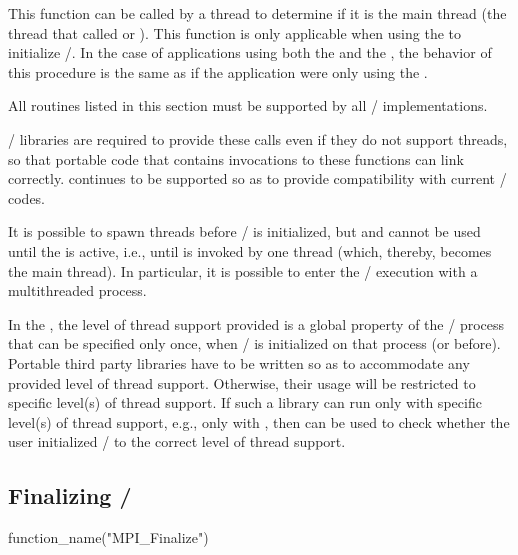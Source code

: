 This function can be called by a thread to determine if it is the
main thread (the thread that called  or
).  This function is only applicable when using the \wpm{} to
initialize \MPI/.  In the case of applications using both the \wpm{}
and the \spm{}, the behavior of this procedure is the same as if the application were only using the \wpm{}.

All routines listed in this section
must be
supported by all \MPI/ implementations.

\begin{rationale}
\MPI/ libraries are required to provide these calls even if they do
not support threads, so that portable code that contains invocations
to these functions can link correctly.  
continues to be
supported so as to provide compatibility with current \MPI/ codes.
\end{rationale}

\begin{users}
It is possible to spawn threads before \MPI/ is initialized, but
  and  cannot be used until the \wpm{} is active,
i.e., until  is invoked by one
thread (which, thereby, becomes the  main thread).  In particular, it is
possible to enter the \MPI/ execution with a multithreaded process.

In the \wpm{}, the level of thread support provided is a global property of the \MPI/
process that can be specified only once, when \MPI/ is initialized on
that process (or before).   Portable third party libraries have to be written so as to
accommodate any provided level of thread support.
Otherwise, their usage will be restricted to specific level(s) of thread support.
If such a library can run only with specific level(s) of thread support, e.g.,
only with , then
 can be used to check whether the
user initialized \MPI/ to the correct level of thread support.
\end{users}

\subsection{Finalizing \texorpdfstring{\mpi/}{MPI}}
\label{sec:inquiry-finalize}

\begin{mpi-binding}
    function_name("MPI_Finalize")
\end{mpi-binding}


